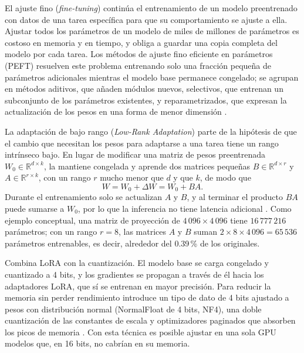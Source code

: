 El ajuste fino (\textit{fine-tuning}) continúa el entrenamiento de un modelo preentrenado con datos de una tarea específica para que su comportamiento se ajuste a ella. Ajustar todos los parámetros de un modelo de miles de millones de parámetros es costoso en memoria y en tiempo, y obliga a guardar una copia completa del modelo por cada tarea. Los métodos de ajuste fino eficiente en parámetros (PEFT) resuelven este problema entrenando solo una fracción pequeña de parámetros adicionales mientras el modelo base permanece congelado; se agrupan en métodos aditivos, que añaden módulos nuevos, selectivos, que entrenan un subconjunto de los parámetros existentes, y reparametrizados, que expresan la actualización de los pesos en una forma de menor dimensión \cite{han2024_peft_survey}.


La adaptación de bajo rango (\textit{Low-Rank Adaptation}) parte de la hipótesis de que el cambio que necesitan los pesos para adaptarse a una tarea tiene un rango intrínseco bajo. En lugar de modificar una matriz de pesos preentrenada $W_0 \in \mathbb{R}^{d \times k}$, la mantiene congelada y aprende dos matrices pequeñas $B \in \mathbb{R}^{d \times r}$ y $A \in \mathbb{R}^{r \times k}$, con un rango $r$ mucho menor que $d$ y que $k$, de modo que
\begin{equation}
W = W_0 + \Delta W = W_0 + BA.
\end{equation}
Durante el entrenamiento solo se actualizan $A$ y $B$, y al terminar el producto $BA$ puede sumarse a $W_0$, por lo que la inferencia no tiene latencia adicional \cite{hu2022_lora}. Como ejemplo conceptual, una matriz de proyección de $4\,096 \times 4\,096$ tiene $16\,777\,216$ parámetros; con un rango $r = 8$, las matrices $A$ y $B$ suman $2 \times 8 \times 4\,096 = 65\,536$ parámetros entrenables, es decir, alrededor del 0.39\,\% de los originales.


Combina LoRA con la cuantización. El modelo base se carga congelado y cuantizado a 4 bits, y los gradientes se propagan a través de él hacia los adaptadores LoRA, que sí se entrenan en mayor precisión. Para reducir la memoria sin perder rendimiento introduce un tipo de dato de 4 bits ajustado a pesos con distribución normal (NormalFloat de 4 bits, NF4), una doble cuantización de las constantes de escala y optimizadores paginados que absorben los picos de memoria \cite{dettmers2023_qlora}. Con esta técnica es posible ajustar en una sola GPU modelos que, en 16 bits, no cabrían en su memoria.

